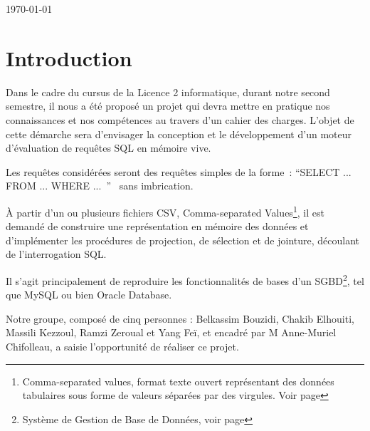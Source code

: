 \documentclass[oneside,13pt,a4paper]{report}
\begin{document}
\begin{titlepage}
	\par\vspace{1cm}

	\vfill

	{\large \today\par}
\end{titlepage}





\parskip=5pt
\chapter*{Introduction}

Dans le cadre du cursus de la Licence 2 informatique, durant notre second semestre, il nous a été proposé un projet qui devra mettre en pratique nos connaissances et nos compétences au travers d'un cahier des charges. L’objet de cette démarche sera d’envisager la conception et le développement d'un moteur d'évaluation de requêtes SQL en mémoire vive.

Les requêtes considérées seront des requêtes simples de la forme : \enquote{SELECT ... FROM ... WHERE ... }  sans imbrication.

À partir d’un ou plusieurs fichiers CSV, Comma-separated Values\footnote{Comma-separated values, format texte ouvert représentant des données tabulaires sous forme de valeurs séparées par des virgules. Voir page \pageref{csv}},
il est demandé de construire une représentation en mémoire des données et d'implémenter les procédures de projection, de sélection et de jointure, découlant de l'interrogation SQL.

Il s'agit principalement de reproduire les fonctionnalités de bases d'un SGBD\footnote{Système de Gestion de Base de Données, voir page \pageref{sgbd}}, tel que MySQL ou bien Oracle Database.

Notre groupe, composé de cinq personnes : Belkassim Bouzidi, Chakib Elhouiti, Massili Kezzoul, Ramzi Zeroual et Yang Feï, et encadré par M Anne-Muriel Chifolleau, a saisie l'opportunité de réaliser ce projet.
\end{document}

